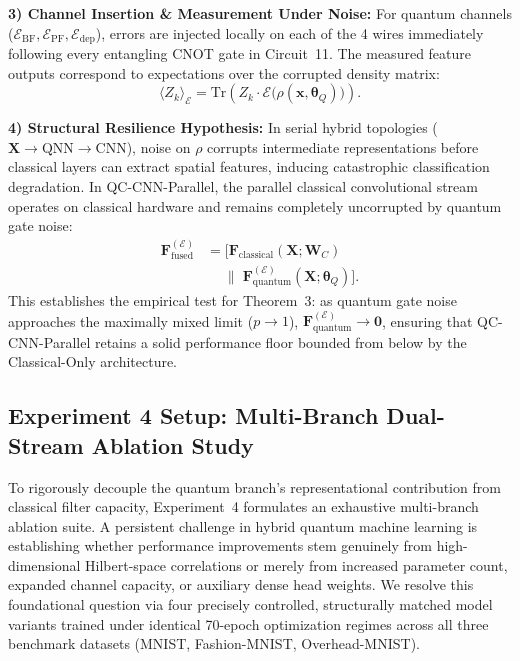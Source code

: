 \documentclass[journal]{IEEEtran}
\begin{document}
\textbf{3) Channel Insertion \& Measurement Under Noise:}
For quantum channels ($\mathcal{E}_{\mathrm{BF}}, \mathcal{E}_{\mathrm{PF}}, \mathcal{E}_{\mathrm{dep}}$), errors are injected locally on each of the 4 wires immediately following every entangling CNOT gate in Circuit~11. The measured feature outputs correspond to expectations over the corrupted density matrix:
\begin{equation}
\langle Z_k \rangle_{\mathcal{E}} = \mathrm{Tr}\left( Z_k \cdot \mathcal{E}\big( \rho(\mathbf{x}, \boldsymbol{\theta}_Q) \big) \right).
\label{eq:noisy_expectation}
\end{equation}

\textbf{4) Structural Resilience Hypothesis:}
In serial hybrid topologies ($\mathbf{X} \to \text{QNN} \to \text{CNN}$), noise on $\rho$ corrupts intermediate representations before classical layers can extract spatial features, inducing catastrophic classification degradation. In QC-CNN-Parallel, the parallel classical convolutional stream operates on classical hardware and remains completely uncorrupted by quantum gate noise:
\begin{align}
\mathbf{F}_{\mathrm{fused}}^{(\mathcal{E})} &= \Big[ \mathbf{F}_{\mathrm{classical}}(\mathbf{X}; \mathbf{W}_C) \nonumber \\
&\quad\; \|\; \mathbf{F}_{\mathrm{quantum}}^{(\mathcal{E})}(\mathbf{X}; \boldsymbol{\theta}_Q) \Big].
\label{eq:fused_noisy_stream}
\end{align}
This establishes the empirical test for Theorem~3: as quantum gate noise approaches the maximally mixed limit ($p \to 1$), $\mathbf{F}_{\mathrm{quantum}}^{(\mathcal{E})} \to \mathbf{0}$, ensuring that QC-CNN-Parallel retains a solid performance floor bounded from below by the Classical-Only architecture.

\subsection{Experiment 4 Setup: Multi-Branch Dual-Stream Ablation Study}
\label{subsec:exp4_setup}
To rigorously decouple the quantum branch's representational contribution from classical filter capacity, Experiment~4 formulates an exhaustive multi-branch ablation suite. A persistent challenge in hybrid quantum machine learning is establishing whether performance improvements stem genuinely from high-dimensional Hilbert-space correlations or merely from increased parameter count, expanded channel capacity, or auxiliary dense head weights. We resolve this foundational question via four precisely controlled, structurally matched model variants trained under identical 70-epoch optimization regimes across all three benchmark datasets (MNIST, Fashion-MNIST, Overhead-MNIST).
\end{document}
